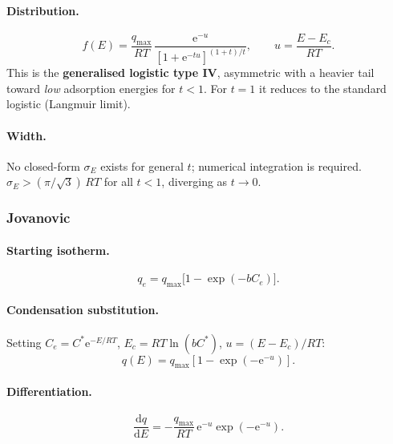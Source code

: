 \documentclass[journal=aamick,manuscript=article]{achemso}
\begin{document}
\paragraph{Distribution.}
\begin{equation}
	f(E) = \frac{q_{\max}}{RT}\,
	\frac{\mathrm{e}^{-u}}
	{[1 + \mathrm{e}^{-tu}]^{(1+t)/t}},
	\qquad u = \frac{E - E_c}{RT}.
	\label{eq:si_fE_toth}
\end{equation}
This is the \textbf{generalised logistic type IV}, asymmetric with a heavier tail
toward \emph{low} adsorption energies for $t < 1$.
For $t = 1$ it reduces to the standard logistic (Langmuir limit).

\paragraph{Width.}
No closed-form $\sigma_E$ exists for general $t$; numerical integration is required.
$\sigma_E > (\pi/\sqrt{3})\,RT$ for all $t < 1$, diverging as $t \to 0$.

\subsubsection{Jovanovic}

\paragraph{Starting isotherm.}
\begin{equation}
	q_e = q_{\max}\bigl[1 - \exp(-b C_e)\bigr].
\end{equation}

\paragraph{Condensation substitution.}
Setting $C_e = C^{\ast}\mathrm{e}^{-E/RT}$, $E_c = RT\ln(bC^{\ast})$,
$u = (E-E_c)/RT$:
\begin{equation}
	q(E) = q_{\max}\!\left[1 - \exp\!\left(-\mathrm{e}^{-u}\right)\right].
\end{equation}

\paragraph{Differentiation.}
\begin{equation}
	\frac{\mathrm{d}q}{\mathrm{d}E}
	= -\frac{q_{\max}}{RT}\,\mathrm{e}^{-u}\exp\!\left(-\mathrm{e}^{-u}\right).
\end{equation}
\end{document}
